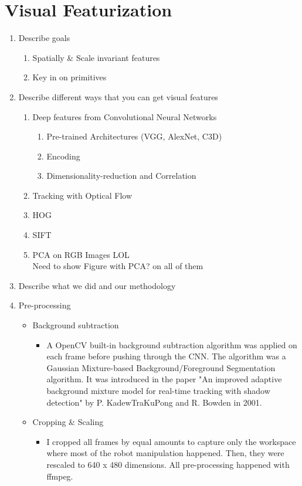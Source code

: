 \section{Visual Featurization}
\begin{enumerate}

\item Describe goals

\begin{enumerate}
\item Spatially \& Scale invariant features
\item Key in on primitives
\end{enumerate}

\item Describe different ways that you can get visual features
\begin{enumerate}
\item Deep features from Convolutional Neural Networks
\begin{enumerate}
\item Pre-trained Architectures (VGG, AlexNet, C3D)
\item Encoding
\item Dimensionality-reduction and Correlation
\end{enumerate}
\item Tracking with Optical Flow
\item HOG
\item SIFT
\item PCA on RGB Images LOL \\
Need to show Figure with PCA? on all of them 
\end{enumerate}

\item Describe what we did and our methodology

\item Pre-processing
\begin{itemize}
\item Background subtraction
\begin{itemize}
\item A OpenCV built-in background subtraction algorithm was applied on each frame before pushing through the CNN. The algorithm was a Gaussian Mixture-based Background/Foreground Segmentation algorithm. It was introduced in the paper "An improved adaptive background mixture model for real-time tracking with shadow detection" by P. KadewTraKuPong and R. Bowden in 2001.
\end{itemize}

\item Cropping \& Scaling
\begin{itemize}
\item I cropped all frames by equal amounts to capture only the workspace where most of the robot manipulation happened. Then, they were rescaled to 640 x 480 dimensions. All pre-processing happened with ffmpeg.
\end{itemize}

\end{itemize}


\end{enumerate}